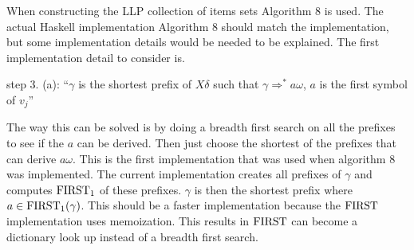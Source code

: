 When constructing the LLP collection of items sets Algorithm 8 \cite[13]{Vagner2007} is used. The actual Haskell implementation Algorithm 8 should match the implementation, but some implementation details would be needed to be explained. The first implementation detail to consider is. 
\begin{center}
    step 3. (a): ``$\gamma$ is the shortest prefix of $X\delta$ such that $\gamma \Rightarrow^* a \omega$, $a$ is the first symbol of $v_j$'' \cite{errata:Vagner2007}
\end{center}
The way this can be solved is by doing a breadth first search on all the prefixes to see if the $a$ can be derived. Then just choose the shortest of the prefixes that can derive $a\omega$. This is the first implementation that was used when algorithm 8 was implemented. The current implementation creates all prefixes of $\gamma$ and computes $\text{FIRST}_1$ of these prefixes. $\gamma$ is then the shortest prefix where $a \in \text{FIRST}_1(\gamma)$. This should be a faster implementation because the $\text{FIRST}$ implementation uses memoization. This results in $\text{FIRST}$ can become a dictionary look up instead of a breadth first search.